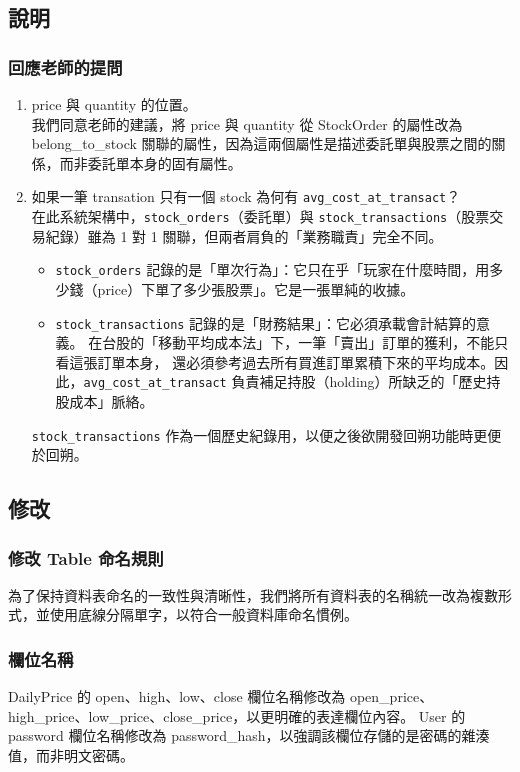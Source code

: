 \documentclass[UTF8, a4paper, 12pt, fontset=none]{ctexart}
\begin{document}
    \subsection{說明}
    \subsubsection{回應老師的提問}
        \begin{enumerate}
            \item price 與 quantity 的位置。\\
            我們同意老師的建議，將 price 與 quantity 從 StockOrder 的屬性改為 belong\_to\_stock 關聯的屬性，因為這兩個屬性是描述委託單與股票之間的關係，而非委託單本身的固有屬性。
            \item 如果一筆 transation 只有一個 stock 為何有 \verb|avg_cost_at_transact|？\\
            在此系統架構中，\verb|stock_orders|（委託單）與 \verb|stock_transactions|（股票交易紀錄）雖為 1 對 1 關聯，但兩者肩負的「業務職責」完全不同。
            \begin{itemize}
                \item \verb|stock_orders| 記錄的是「單次行為」：它只在乎「玩家在什麼時間，用多少錢（price）下單了多少張股票」。它是一張單純的收據。
                \item \verb|stock_transactions| 記錄的是「財務結果」：它必須承載會計結算的意義。
                在台股的「移動平均成本法」下，一筆「賣出」訂單的獲利，不能只看這張訂單本身，
                還必須參考過去所有買進訂單累積下來的平均成本。因此，\verb|avg_cost_at_transact| 
                負責補足持股（holding）所缺乏的「歷史持股成本」脈絡。
            \end{itemize}
            \verb|stock_transactions| 作為一個歷史紀錄用，以便之後欲開發回朔功能時更便於回朔。
        \end{enumerate}
    \subsection{修改}
        \subsubsection{修改 Table 命名規則}
        為了保持資料表命名的一致性與清晰性，我們將所有資料表的名稱統一改為複數形式，並使用底線分隔單字，以符合一般資料庫命名慣例。
        
        \subsubsection{欄位名稱}
        DailyPrice 的 open、high、low、close 欄位名稱修改為 open\_price、high\_price、low\_price、close\_price，以更明確的表達欄位內容。
        User 的 password 欄位名稱修改為 password\_hash，以強調該欄位存儲的是密碼的雜湊值，而非明文密碼。
\end{document}
